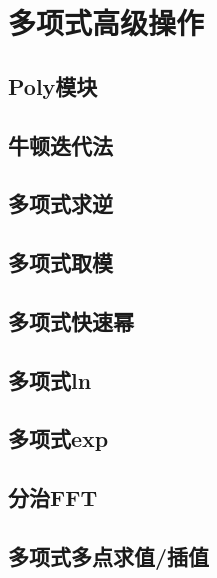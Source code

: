 \section{多项式高级操作}
\subsection{Poly模块}
\subsection{牛顿迭代法}
\subsection{多项式求逆}
\subsection{多项式取模}
\subsection{多项式快速幂}
\subsection{多项式ln}
\subsection{多项式exp}
\subsection{分治FFT}
\subsection{多项式多点求值/插值}